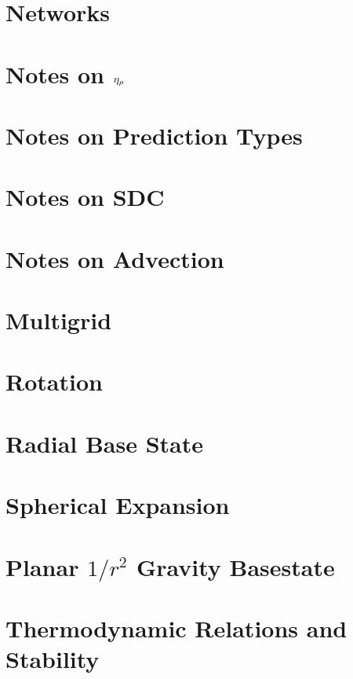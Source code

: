 \documentclass[11pt]{book}    %
\begin{document}
\chapter{Networks}


\chapter{Notes on $\eta_{\rho}$}


\chapter{Notes on Prediction Types}


\chapter{Notes on SDC}
\label{ch:sdc}


\chapter{Notes on Advection}


\chapter{Multigrid}


\chapter{Rotation}


\chapter{Radial Base State}


\chapter{Spherical Expansion}


\chapter{Planar $1/r^2$ Gravity Basestate}


\chapter{Thermodynamic Relations and Stability}

\end{document}
